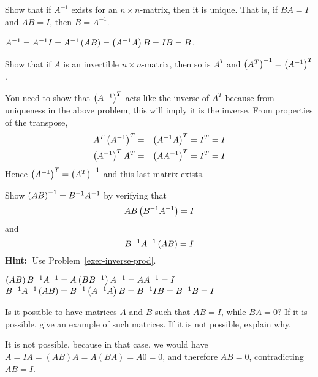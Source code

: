 \begin{enumialphparenastyle}
\begin{ex}\label{exer-inverse-prod}Show that if $A^{-1}$ exists for an $n\times n$-matrix, then it is unique. That is, if $BA=I$ and $AB=I$, then $B=A^{-1}$. 
\begin{sol}
 $A^{-1}=A^{-1}I=A^{-1}\left(AB\right) =\left(A^{-1}A\right) B=IB=B$.
\end{sol}
\end{ex}

\begin{ex}Show that if $A$ is an invertible $n\times n$-matrix, then so is 
$A^{T} $ and $\left(A^{T}\right) ^{-1}=\left(A^{-1}\right) ^{T}$. 
\begin{sol}
 You need to show that $\left(A^{-1}\right) ^{T}$ acts like the inverse of $A^{T}
$ because from uniqueness in the above problem, this will imply it is the
inverse. From properties of the transpose,
\begin{eqnarray*}
A^{T}\left(A^{-1}\right) ^{T} &=&\left(A^{-1}A\right) ^{T}=I^{T}=I \\
\left(A^{-1}\right) ^{T}A^{T} &=&\left(AA^{-1}\right) ^{T}=I^{T}=I
\end{eqnarray*}
Hence $\left(A^{-1}\right) ^{T}=\left(A^{T}\right) ^{-1}$ and this last
matrix exists.
\end{sol}
\end{ex}

\begin{ex}Show $\left(AB\right) ^{-1}=B^{-1}A^{-1}$ by verifying that 
\begin{equation*}
AB\left(
B^{-1}A^{-1}\right) =I
\end{equation*} and 
\begin{equation*}
B^{-1}A^{-1}\left(AB\right) =I
\end{equation*}
\textbf{Hint:\ }Use Problem~\ref{exer-inverse-prod}.
\begin{sol}
$\left(AB\right)
B^{-1}A^{-1}=A\left(BB^{-1}\right) A^{-1}=AA^{-1}=I$ $B^{-1}A^{-1}\left(
AB\right) =B^{-1}\left(A^{-1}A\right) B=B^{-1}IB=B^{-1}B=I$
\end{sol}
\end{ex}

\begin{ex}
  Is it possible to have matrices $A$ and $B$ such that $AB=I$, while
  $BA=0$? If it is possible, give an example of such matrices. If it
  is not possible, explain why.
  \begin{sol}
    It is not possible, because in that case, we would have
    $A=IA=(AB)A=A(BA)=A0=0$, and therefore $AB=0$, contradicting $AB=I$.
  \end{sol}
\end{ex}


\end{enumialphparenastyle}

